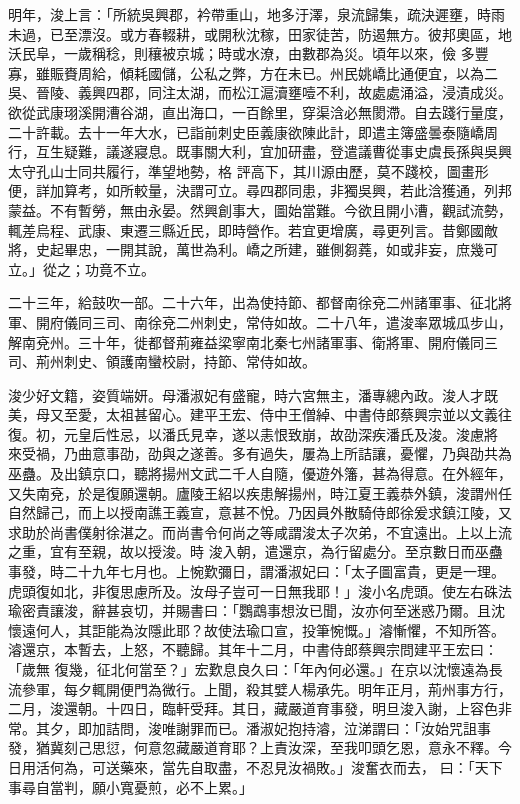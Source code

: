 \begin{pinyinscope}
 明年，浚上言：「所統吳興郡，衿帶重山，地多汙澤，泉流歸集，疏決遲壅，時雨未過，已至漂沒。或方春輟耕，或開秋沈稼，田家徒苦，防遏無方。彼邦奧區，地沃民阜，一歲稱稔，則穰被京城；時或水潦，由數郡為災。頃年以來，儉
 多豐寡，雖賑賚周給，傾耗國儲，公私之弊，方在未已。州民姚嶠比通便宜，以為二吳、晉陵、義興四郡，同注太湖，而松江滬瀆壅噎不利，故處處涌溢，浸漬成災。欲從武康珝溪開漕谷湖，直出海口，一百餘里，穿渠浛必無閡滯。自去踐行量度，二十許載。去十一年大水，已詣前刺史臣義康欲陳此計，即遣主簿盛曇泰隨嶠周行，互生疑難，議遂寢息。既事關大利，宜加研盡，登遣議曹從事史虞長孫與吳興太守孔山士同共履行，準望地勢，格
 評高下，其川源由歷，莫不踐校，圖畫形便，詳加算考，如所較量，決謂可立。尋四郡同患，非獨吳興，若此浛獲通，列邦蒙益。不有暫勞，無由永晏。然興創事大，圖始當難。今欲且開小漕，觀試流勢，輒差烏程、武康、東遷三縣近民，即時營作。若宜更增廣，尋更列言。昔鄭國敵將，史起畢忠，一開其說，萬世為利。嶠之所建，雖側芻蕘，如或非妄，庶幾可立。」從之；功竟不立。



 二十三年，給鼓吹一部。二十六年，出為使持節、都督南徐兗二州諸軍事、征北將
 軍、開府儀同三司、南徐兗二州刺史，常侍如故。二十八年，遣浚率眾城瓜步山，解南兗州。三十年，徙都督荊雍益梁寧南北秦七州諸軍事、衛將軍、開府儀同三司、荊州刺史、領護南蠻校尉，持節、常侍如故。



 浚少好文籍，姿質端妍。母潘淑妃有盛寵，時六宮無主，潘專總內政。浚人才既美，母又至愛，太祖甚留心。建平王宏、侍中王僧綽、中書侍郎蔡興宗並以文義往復。初，元皇后性忌，以潘氏見幸，遂以恚恨致崩，故劭深疾潘氏及浚。浚慮將
 來受禍，乃曲意事劭，劭與之遂善。多有過失，屢為上所詰讓，憂懼，乃與劭共為巫蠱。及出鎮京口，聽將揚州文武二千人自隨，優遊外籓，甚為得意。在外經年，又失南兗，於是復願還朝。廬陵王紹以疾患解揚州，時江夏王義恭外鎮，浚謂州任自然歸己，而上以授南譙王義宣，意甚不悅。乃因員外散騎侍郎徐爰求鎮江陵，又求助於尚書僕射徐湛之。而尚書令何尚之等咸謂浚太子次弟，不宜遠出。上以上流之重，宜有至親，故以授浚。時
 浚入朝，遣還京，為行留處分。至京數日而巫蠱事發，時二十九年七月也。上惋歎彌日，謂潘淑妃曰：「太子圖富貴，更是一理。虎頭復如北，非復思慮所及。汝母子豈可一日無我耶！」浚小名虎頭。使左右硃法瑜密責讓浚，辭甚哀切，并賜書曰：「鸚鵡事想汝已聞，汝亦何至迷惑乃爾。且沈懷遠何人，其詎能為汝隱此耶？故使法瑜口宣，投筆惋慨。」濬慚懼，不知所答。濬還京，本暫去，上怒，不聽歸。其年十二月，中書侍郎蔡興宗問建平王宏曰：「歲無
 復幾，征北何當至？」宏歎息良久曰：「年內何必還。」在京以沈懷遠為長流參軍，每夕輒開便門為微行。上聞，殺其嬖人楊承先。明年正月，荊州事方行，二月，浚還朝。十四日，臨軒受拜。其日，藏嚴道育事發，明旦浚入謝，上容色非常。其夕，即加詰問，浚唯謝罪而已。潘淑妃抱持濬，泣涕謂曰：「汝始咒詛事發，猶冀刻己思愆，何意忽藏嚴道育耶？上責汝深，至我叩頭乞恩，意永不釋。今日用活何為，可送藥來，當先自取盡，不忍見汝禍敗。」浚奮衣而去，
 曰：「天下事尋自當判，願小寬憂煎，必不上累。」




\end{pinyinscope}
